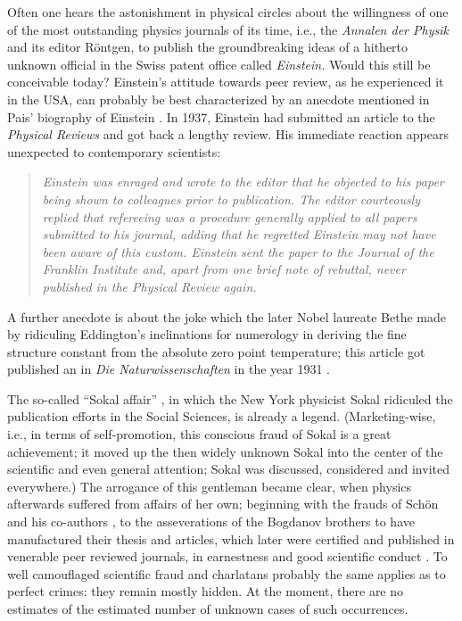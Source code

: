 Often one hears the astonishment in physical circles about the
willingness of one of the most outstanding physics journals of its time,
i.e., the {\it Annalen der Physik} and its editor R\"ontgen, to publish
the groundbreaking ideas of a hitherto unknown official in the Swiss
patent office called {\em Einstein.}  Would this still be conceivable
today?  Einstein's attitude towards peer review, as he experienced it in
the USA, can probably be best characterized by an anecdote mentioned in
Pais' biography of Einstein  \cite[pp. 494-495]{pais}.  In 1937, Einstein
had submitted an article to the {\it Physical Reviews}
and got back a lengthy review.  His immediate reaction appears
unexpected to contemporary scientists:  \begin{quote} {\em Einstein was
enraged and wrote to the editor that he objected to his paper being
shown to colleagues prior to publication.  The editor courteously
replied that refereeing was a procedure generally applied to all papers
submitted to his journal, adding that he regretted Einstein may not have
been aware of this custom.  Einstein sent the paper to the Journal of
the Franklin Institute and, apart from one brief note of rebuttal, never
published in the Physical Review again.} \end{quote}

A further anecdote is about the joke which the later Nobel laureate Bethe
made by ridiculing Eddington's inclinations for numerology in deriving
the fine structure constant from the absolute zero point temperature;
this article got published an  in
{\it Die Naturwissenschaften} in the year 1931
\cite{beck-bethe-riezler}.

The so-called ``Sokal affair'' \cite{sokal-aff}, in which the New York
physicist Sokal ridiculed the publication efforts in the Social
Sciences, is already a legend.  (Marketing-wise, i.e., in terms of
self-promotion, this conscious fraud of Sokal is a great achievement; it
moved up the then widely unknown Sokal into the center of the scientific
and even general attention; Sokal was discussed, considered and invited
everywhere.)  The arrogance of this gentleman became clear, when physics
afterwards suffered from affairs of her own; beginning with the frauds
of Sch\"on and his co-authors \cite{schoen-2002}, to the asseverations
of the Bogdanov brothers to have manufactured their thesis and
articles, which later were certified and published in venerable peer
reviewed journals, in earnestness and good scientific conduct
\cite{bogdanov-affair}.  To well camouflaged scientific fraud and
charlatans probably the same applies as to perfect crimes:  they remain
mostly hidden.  At the moment, there are no estimates of
the estimated number of unknown cases
of such occurrences.

